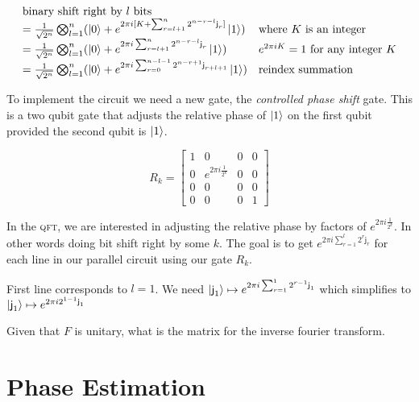 \[\begin{array}{ll}
		\text{binary shift right by } l \text{ bits} \\
		= \frac{1}{\sqrt{2^n}} \bigotimes^n_{l=1} (\left|0\right\rangle + e^{2\pi i
		[K + \sum^{n}_{r=l+1} 2^{n-r-l} \textsf{j}_r]}  \left|1\right\rangle) & \text{where } K\text{ is an integer} \\
		= \frac{1}{\sqrt{2^n}} \bigotimes^n_{l=1} (\left|0\right\rangle + e^{2\pi i
		\sum^{n}_{r=l+1} 2^{n-r-l} \textsf{j}_r}  \left|1\right\rangle)  & e^{2\pi i K} = 1 \text{ for any integer } K \\
        = \frac{1}{\sqrt{2^n}} \bigotimes^n_{l=1} (\left|0\right\rangle + e^{2\pi i
        \sum^{n-l-1}_{r=0} 2^{n-r+1} \textsf{j}_{r+l+1}}  \left|1\right\rangle)  & \text{reindex summation }
\end{array}
\] 



To implement the circuit we need a new gate, the \textit{controlled phase shift} gate.
This is a two qubit gate that adjusts the relative phase of $\left|1\right\rangle$ on the first qubit provided 
the second qubit is $\left|1\right\rangle$.

$$
R_k = \begin{bmatrix}
       1 & 0 & 0 & 0                        \\[0.3em]
       0 & e^{2\pi i \frac{1}{2^k}} & 0 & 0 \\[0.3em]
       0 & 0 & 0 & 0 \\[0.3em]
       0 & 0 & 0 & 1
     \end{bmatrix}
$$

In the \textsc{qft}, we are interested in adjusting the relative phase by factors of 
$e^{2\pi i \frac{1}{2^k}}$. In other words doing bit shift right by some $k$. 
The goal is to get  $e^{2\pi i \sum^{l}_{r=1} 2^{r} \textsf{j}_r }$ for each line in our 
parallel circuit using our gate $R_k$.

First line corresponds to $l = 1$. We need $\left|\textsf{j}_1\right\rangle \mapsto e^{2\pi i \sum^{1}_{r=1} 2^{r-1} \textsf{j}_1}$
which simplifies to $\left|\textsf{j}_1\right\rangle \mapsto e^{2\pi i 2^{1-1} \textsf{j}_1}$

\begin{example}
Given that $F$ is unitary, what is the matrix for the inverse fourier transform.
\end{example}


\section{Phase Estimation}




